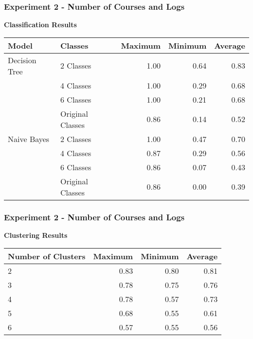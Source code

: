 \begin{frame}
\frametitle{Experiment 2 - Number of Courses and Logs}

\textbf{Classification Results}

\vspace{0.5cm}

{

\small
\centering

\begin{tabular}{| l | l | r | r | r |}
    \hline
    \textbf{Model} & \textbf{Classes} & \textbf{Maximum} & \textbf{Minimum} & \textbf{Average} \\ \hline
    Decision Tree & 2 Classes        & 1.00 & 0.64 & 0.83 \\
                  & 4 Classes        & 1.00 & 0.29 & 0.68 \\
                  & 6 Classes        & 1.00 & 0.21 & 0.68 \\
                  & Original Classes & 0.86 & 0.14 & 0.52 \\ \hline
    Naive Bayes   & 2 Classes        & 1.00 & 0.47 & 0.70 \\
                  & 4 Classes        & 0.87 & 0.29 & 0.56 \\
                  & 6 Classes        & 0.86 & 0.07 & 0.43 \\
                  & Original Classes & 0.86 & 0.00 & 0.39 \\ \hline
\end{tabular}

}

\end{frame}

\begin{frame}
\frametitle{Experiment 2 - Number of Courses and Logs}

\textbf{Clustering Results}

\vspace{0.5cm}

{

\small
\centering

\begin{tabular}{| l | r | r | r |}
    \hline
    \textbf{Number of Clusters} & \textbf{Maximum} & \textbf{Minimum} & \textbf{Average} \\ \hline
    2 & 0.83 & 0.80 & 0.81 \\ \hline
    3 & 0.78 & 0.75 & 0.76 \\ \hline
    4 & 0.78 & 0.57 & 0.73 \\ \hline
    5 & 0.68 & 0.55 & 0.61 \\ \hline
    6 & 0.57 & 0.55 & 0.56 \\ \hline
\end{tabular}

}

\end{frame}

